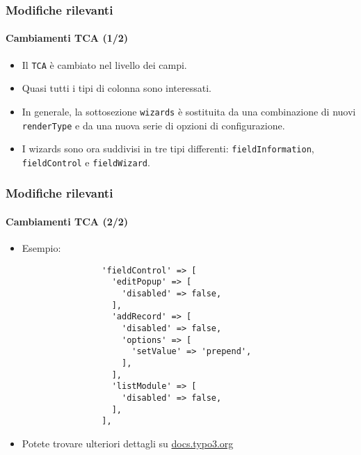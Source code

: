 \begin{frame}[fragile]
	\frametitle{Modifiche rilevanti}
	\framesubtitle{Cambiamenti TCA (1/2)}

	\begin{itemize}

		\item Il \texttt{TCA} è cambiato nel livello dei campi.

		\item Quasi tutti i tipi di colonna sono interessati.

		\item In generale, la sottosezione \texttt{wizards} è sostituita da una combinazione di nuovi
			\texttt{renderType} e da una nuova serie di opzioni di configurazione.

		\item I wizards sono ora suddivisi in tre tipi differenti: \texttt{fieldInformation}, \texttt{fieldControl}
			e \texttt{fieldWizard}.

	\end{itemize}

\end{frame}

\begin{frame}[fragile]
	\frametitle{Modifiche rilevanti}
	\framesubtitle{Cambiamenti TCA (2/2)}

	\lstset{basicstyle=\tiny\ttfamily}

	\begin{itemize}
		\item Esempio:

			\begin{lstlisting}
				'fieldControl' => [
				  'editPopup' => [
				    'disabled' => false,
				  ],
				  'addRecord' => [
				    'disabled' => false,
				    'options' => [
				      'setValue' => 'prepend',
				    ],
				  ],
				  'listModule' => [
				    'disabled' => false,
				  ],
				],
			\end{lstlisting}

		\item Potete trovare ulteriori dettagli su
			\href{https://docs.typo3.org/typo3cms/extensions/core/8-dev/singlehtml/Index.html#deprecation-79440-formengine-element-expansion}{docs.typo3.org}

	\end{itemize}

\end{frame}


